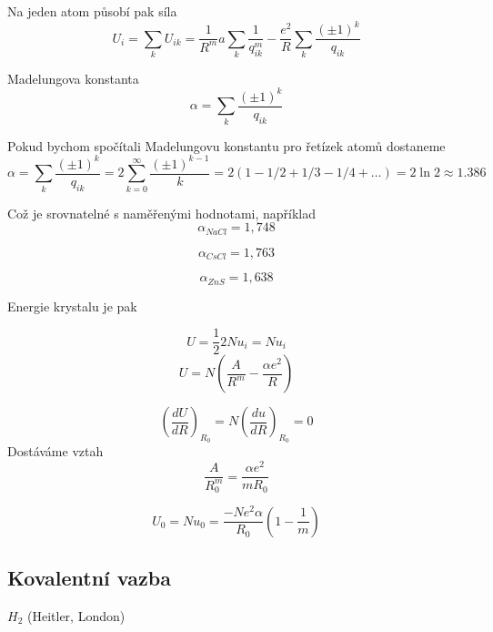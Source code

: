 \documentclass[../main.tex]{subfiles}
\begin{document}
Na jeden atom působí pak síla 
\begin{equation}
    U_i = \sum_{k} U_{ik} = \frac{1}{R^m} a \sum_k \frac{1}{q^m_{ik}}
    - \frac{e^2}{R} \sum_k \frac{(\pm 1)^k}{q_{ik}}    
\end{equation}

Madelungova konstanta
\begin{equation}
   \alpha = \sum_k \frac{(\pm 1)^k}{q_{ik}} 
\end{equation}

Pokud bychom spočítali Madelungovu konstantu pro řetízek atomů dostaneme 
\begin{equation}
    \alpha = \sum_k \frac{(\pm 1)^k}{q_{ik}} = 
    2 \sum_{k=0}^\infty \frac{(\pm 1)^{k-1}}{k} =
    2\left(1 - 1/2 + 1/3 - 1/4 + \dots\right)=
    2 \ln 2 \approx 1.386 
\end{equation}

Což je srovnatelné s naměřenými hodnotami, například
\begin{equation}
    \alpha_{NaCl} = 1,748
\end{equation}

\begin{equation}
    \alpha_{CsCl} = 1,763
\end{equation}

\begin{equation}
    \alpha_{ZnS} = 1,638
\end{equation}

Energie krystalu je pak 

\begin{equation}
    U = \frac{1}{2} 2 N u_i = N u_i
\end{equation}
\begin{equation}
    U = N(\frac{A}{R^m} - \frac{\alpha e^2}{R})
\end{equation}

\begin{equation}
    \left(\frac{dU}{dR}\right)_{R_0} = N \left(\frac{du}{dR}\right)_{R_0} = 0
\end{equation}
Dostáváme vztah
\begin{equation}
    \frac{A}{R^m_0} = \frac{\alpha e^2}{m R_0}
\end{equation}

\begin{equation}
    U_0 = N u_0 = \frac{-N e^2 \alpha}{R_0} \left(1-\frac{1}{m}\right)
\end{equation}

\subsection{Kovalentní vazba}
$H_2$ (Heitler, London)
\end{document}
